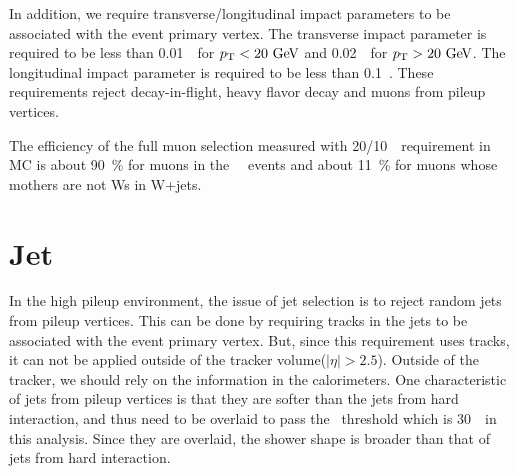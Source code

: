 In addition, we require transverse/longitudinal impact parameters 
to be associated with the event primary vertex. 
The transverse impact parameter is required 
to be less than 0.01~\cm\ for $p_\mathrm{T}<20~\mathrm{Ge\kern -0.1em V}$ and 0.02~\cm\ for $p_\mathrm{T}>20~\mathrm{Ge\kern -0.1em V}$. 
The longitudinal impact parameter is required to be less than 0.1~\cm. 
These requirements reject decay-in-flight, heavy flavor decay and 
muons from pileup vertices. 


The efficiency of the full muon selection measured with 20/10~\GeV\ requirement 
in MC is about 90~\% for muons in the ~\GeV\ events 
and about 11~\% for muons whose mothers are not Ws in W+jets.

\section{ Jet }
\label{sec:jetselection}

In the high pileup environment, the issue of jet selection is to reject random 
jets from pileup vertices. This can be done by requiring tracks in the jets to 
be associated with the event primary vertex. But, since this requirement uses 
tracks, it can not be applied outside of the tracker volume($|\eta|>2.5$).
Outside of the tracker, we should rely on the information in the calorimeters. 
One characteristic of jets from pileup vertices is that they are softer than 
the jets from hard interaction, and thus need to be overlaid to pass the 
\pt\ threshold which is 30~\GeV\ in this analysis. Since they are overlaid, 
the shower shape is broader than that of jets from hard interaction.     

